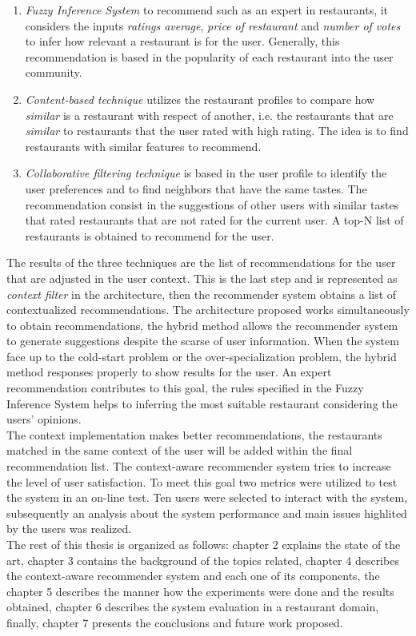 \begin{enumerate}  
\item \textit{Fuzzy Inference System} to recommend such as an expert
in restaurants, it considers the inputs \textit{ratings average},
\textit{price of restaurant} and \textit{number of votes} to infer how
relevant a restaurant is for the user.  Generally, this recommendation
is based in the popularity of each restaurant into the user community.
\item \textit{Content-based technique} utilizes the restaurant profiles 
to compare how \textit{similar} is a restaurant with respect of another, i.e.  
the restaurants that are \textit{similar} to restaurants 
that the user rated with high rating. The idea is to find restaurants 
with similar features to recommend. 
\item \textit{Collaborative filtering
technique} is based in the user profile to identify the user
preferences and to find neighbors that have the same tastes. The
recommendation consist in the suggestions of other users with similar
tastes that rated restaurants that are not rated for the current user.
A top-N list of restaurants is obtained to recommend for the user. 
\end{enumerate}  
The results of the three techniques are the list of
recommendations for the user that  are adjusted in the user context.
This is the last step and is represented as \textit{context filter} in
the architecture, then the recommender system obtains a list of
contextualized recommendations. The architecture proposed works
simultaneously to obtain recommendations, the hybrid method allows the
recommender system to generate suggestions despite the scarse
of user information. When the system face up to the cold-start
problem or the over-specialization problem, the hybrid method
responses properly to show results for the user. An expert 
recommendation contributes to this goal, the rules specified in 
the Fuzzy Inference System helps to inferring the most suitable 
restaurant considering the users' opinions.\\
The context implementation makes better recommendations, the
restaurants matched in the same context of the user will be added
within the final recommendation list. The context-aware recommender
system tries to increase the level of user satisfaction. To meet this
goal two metrics were utilized to test the system in an on-line test.
Ten users were selected to interact with the system, subsequently an
analysis about the system performance and main issues highlited by the
users was realized. \\
The rest of this thesis is organized as follows: chapter 2 explains
the state of the art,  chapter 3 contains the background of the topics
related, chapter 4  describes the context-aware recommender system and
each one of its components, the chapter 5 describes the manner how the
experiments were done  and the results obtained, chapter 6 describes
the system evaluation in a restaurant domain, finally, chapter 7
presents the conclusions and future work proposed.




